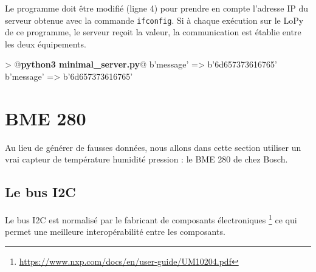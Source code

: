 
Le programme  doit être modifié (ligne 4) pour prendre en compte l'adresse IP du serveur obtenue avec la commande \texttt{ifconfig}. Si à chaque exécution sur le LoPy de ce programme, le serveur reçoit la valeur, la communication est établie entre les deux équipements.

\begin{termc}[backgroundcolor=\color{palerod}, basicstyle=\ttfamily\small, escapechar=@]
> @\textbf{python3 minimal\_server.py}@
b'message' => b'6d657373616765'
b'message' => b'6d657373616765'
\end{termc}


\section{BME 280}

\begin{figure}
\end{figure}

Au lieu de générer de fausses données, nous allons dans cette section utiliser un vrai capteur de température humidité pression : le BME 280 de chez Bosch. 


\subsection{Le bus I2C}

Le bus I2C est  normalisé par le fabricant de composants électroniques  \footnote{\url{https://www.nxp.com/docs/en/user-guide/UM10204.pdf}} ce qui permet une meilleure interopérabilité entre les composants.

